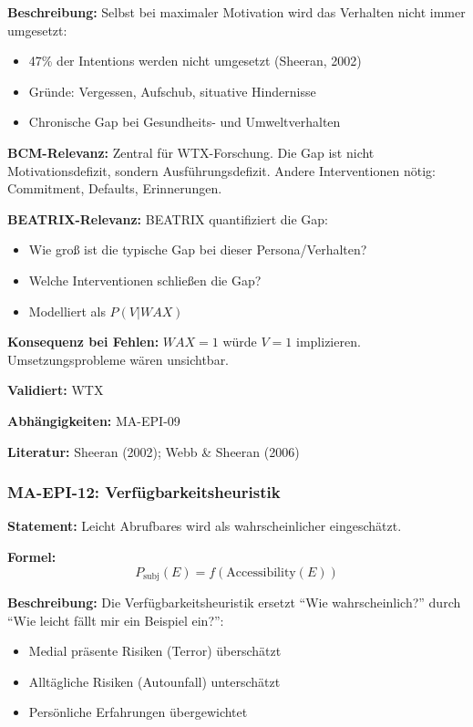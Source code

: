 \textbf{Beschreibung:}
Selbst bei maximaler Motivation wird das Verhalten nicht immer umgesetzt:
\begin{itemize}
    \item 47\% der Intentions werden nicht umgesetzt (Sheeran, 2002)
    \item Gründe: Vergessen, Aufschub, situative Hindernisse
    \item Chronische Gap bei Gesundheits- und Umweltverhalten
\end{itemize}

\textbf{BCM-Relevanz:}
Zentral für WTX-Forschung. Die Gap ist nicht Motivationsdefizit, sondern Ausführungsdefizit. Andere Interventionen nötig: Commitment, Defaults, Erinnerungen.

\textbf{BEATRIX-Relevanz:}
BEATRIX quantifiziert die Gap:
\begin{itemize}
    \item Wie groß ist die typische Gap bei dieser Persona/Verhalten?
    \item Welche Interventionen schließen die Gap?
    \item Modelliert als $P(V|WAX)$
\end{itemize}

\textbf{Konsequenz bei Fehlen:}
$WAX = 1$ würde $V = 1$ implizieren. Umsetzungsprobleme wären unsichtbar.

\textbf{Validiert:} WTX

\textbf{Abhängigkeiten:} MA-EPI-09

\textbf{Literatur:} Sheeran (2002); Webb \& Sheeran (2006)


\subsubsection*{MA-EPI-12: Verfügbarkeitsheuristik}

\textbf{Statement:} Leicht Abrufbares wird als wahrscheinlicher eingeschätzt.

\textbf{Formel:}
\begin{equation}
P_{\text{subj}}(E) = f(\text{Accessibility}(E))
\end{equation}

\textbf{Beschreibung:}
Die Verfügbarkeitsheuristik ersetzt ``Wie wahrscheinlich?'' durch ``Wie leicht fällt mir ein Beispiel ein?'':
\begin{itemize}
    \item Medial präsente Risiken (Terror) überschätzt
    \item Alltägliche Risiken (Autounfall) unterschätzt
    \item Persönliche Erfahrungen übergewichtet
\end{itemize}

